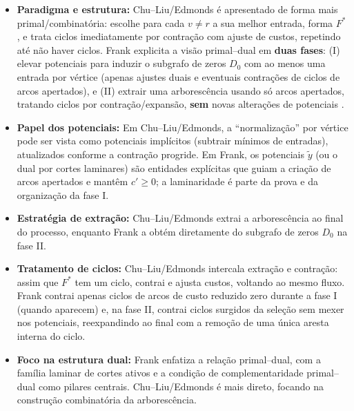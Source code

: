 \documentclass[12pt,a4paper]{article}
\def\emph#1{#1}%
\begin{document}
\begin{itemize}\setlength{\itemsep}{2pt}
    \item \textbf{Paradigma e estrutura:} \emph{Chu–Liu/Edmonds} é apresentado de forma mais \emph{primal/combinatória}: escolhe para cada \(v\neq r\) a sua melhor entrada, forma \(F^*\), e trata ciclos imediatamente por contração com ajuste de custos, repetindo até não haver ciclos. 
    \emph{Frank} explicita a visão \emph{primal–dual} em \textbf{duas fases}: (I) elevar potenciais para induzir o subgrafo de zeros \(D_0\) com ao menos uma entrada por vértice (apenas ajustes duais e eventuais contrações de ciclos de arcos apertados), e (II) extrair uma arborescência usando \emph{só} arcos apertados, tratando ciclos por contração/expansão, \textbf{sem} novas alterações de potenciais \cite{frank1981,frank2014,schrijver2003comb}.
    
    \item \textbf{Papel dos potenciais:} Em \emph{Chu–Liu/Edmonds}, a “normalização” por vértice pode ser vista como potenciais \emph{implícitos} (subtrair mínimos de entradas), atualizados conforme a contração progride. Em \emph{Frank}, os potenciais \(\tilde y\) (ou o dual por cortes laminares) são entidades \emph{explícitas} que guiam a criação de arcos apertados e mantêm \(c'\ge 0\); a laminaridade é parte da prova e da organização da fase I.
 
    \item \textbf{Estratégia de extração:} \emph{Chu–Liu/Edmonds} extrai a arborescência ao final do processo, enquanto \emph{Frank} a obtém diretamente do subgrafo de zeros \(D_0\) na fase II.

    \item \textbf{Tratamento de ciclos:} \emph{Chu–Liu/Edmonds} intercala extração e contração: assim que \(F^*\) tem um ciclo, contrai e ajusta custos, voltando ao mesmo fluxo. \emph{Frank} contrai apenas ciclos de arcos de custo reduzido zero durante a fase I (quando aparecem) e, na fase II, contrai ciclos surgidos da seleção \emph{sem} mexer nos potenciais, reexpandindo ao final com a remoção de uma única aresta interna do ciclo.
    
    \item \textbf{Foco na estrutura dual:} \emph{Frank} enfatiza a relação primal–dual, com a família laminar de cortes ativos e a condição de complementaridade primal–dual como pilares centrais. \emph{Chu–Liu/Edmonds} é mais direto, focando na construção combinatória da arborescência.
 

\end{itemize}
\end{document}
